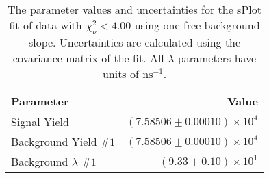 
\begin{table}[h]
    \begin{center}
        \begin{tabular}{lr}\toprule
            Parameter & Value \\\midrule
            Signal Yield & $(7.58506 \pm 0.00010) \times 10^{4}$ \\
            Background Yield $\#1$ & $(7.58506 \pm 0.00010) \times 10^{4}$ \\
            Background $\lambda$ $\#1$ & $(9.33 \pm 0.10) \times 10^{1}$ \\\bottomrule
        \end{tabular}
        \caption{The parameter values and uncertainties for the sPlot fit of data with $\chi^2_\nu < 4.00$ using one free background slope. Uncertainties are calculated using the covariance matrix of the fit. All $\lambda$ parameters have units of $\si{\nano\second}^{-1}$.}
    \end{center}
\end{table}
